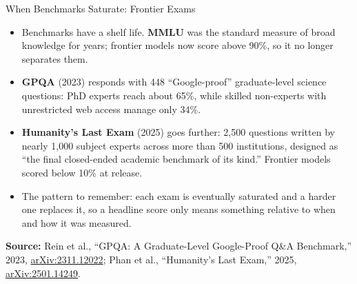 \begin{frame}{When Benchmarks Saturate: Frontier Exams}
  \begin{itemize}\itemsep0.45em
    \item[\textcolor{red}{$\blacktriangleright$}] Benchmarks have a shelf life. \textbf{MMLU} was the standard measure of broad knowledge for years; frontier models now score above 90\%, so it no longer separates them.
    \item[\textcolor{red}{$\blacktriangleright$}] \textbf{GPQA} (2023) responds with 448 ``Google-proof'' graduate-level science questions: PhD experts reach about 65\%, while skilled non-experts with unrestricted web access manage only 34\%.
    \item[\textcolor{red}{$\blacktriangleright$}] \textbf{Humanity's Last Exam} (2025) goes further: 2{,}500 questions written by nearly 1{,}000 subject experts across more than 500 institutions, designed as ``the final closed-ended academic benchmark of its kind.'' Frontier models scored below 10\% at release.
    \item[\textcolor{red}{$\blacktriangleright$}] The pattern to remember: each exam is eventually saturated and a harder one replaces it, so a headline score only means something relative to when and how it was measured.
  \end{itemize}
  \vspace{0.3em}
  {\scriptsize \textbf{Source:} Rein et al., ``GPQA: A Graduate-Level Google-Proof Q\&A Benchmark,'' 2023, \href{https://arxiv.org/abs/2311.12022}{arXiv:2311.12022}; Phan et al., ``Humanity's Last Exam,'' 2025, \href{https://arxiv.org/abs/2501.14249}{arXiv:2501.14249}.}
\end{frame}
